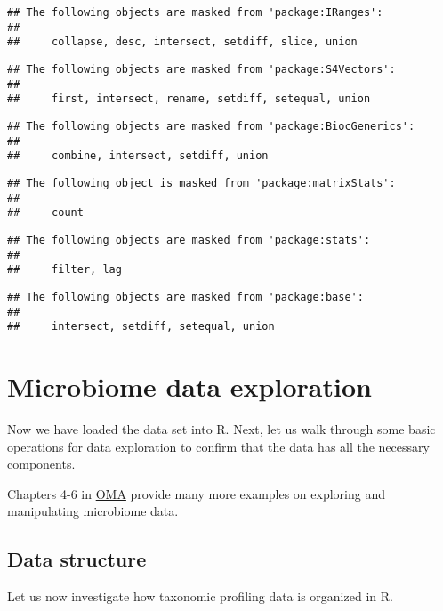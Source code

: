 \documentclass[
  oneside]{book}
\begin{document}
\begin{verbatim}
## The following objects are masked from 'package:IRanges':
## 
##     collapse, desc, intersect, setdiff, slice, union
\end{verbatim}

\begin{verbatim}
## The following objects are masked from 'package:S4Vectors':
## 
##     first, intersect, rename, setdiff, setequal, union
\end{verbatim}

\begin{verbatim}
## The following objects are masked from 'package:BiocGenerics':
## 
##     combine, intersect, setdiff, union
\end{verbatim}

\begin{verbatim}
## The following object is masked from 'package:matrixStats':
## 
##     count
\end{verbatim}

\begin{verbatim}
## The following objects are masked from 'package:stats':
## 
##     filter, lag
\end{verbatim}

\begin{verbatim}
## The following objects are masked from 'package:base':
## 
##     intersect, setdiff, setequal, union
\end{verbatim}

\hypertarget{microbiome-data-exploration}{%
\chapter{Microbiome data exploration}\label{microbiome-data-exploration}}

Now we have loaded the data set into R. Next, let us walk through some
basic operations for data exploration to confirm that the data has all
the necessary components.

Chapters 4-6 in
\href{https://microbiome.github.io/OMA/datamanipulation.html}{OMA} provide
many more examples on exploring and manipulating microbiome data.

\hypertarget{data-structure}{%
\section{Data structure}\label{data-structure}}

Let us now investigate how taxonomic profiling data is organized in R.
\end{document}
